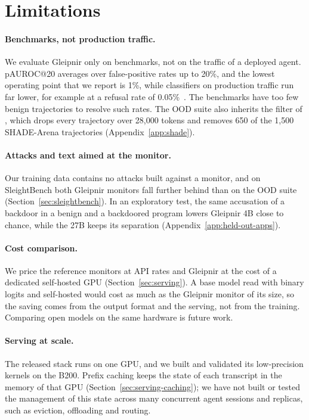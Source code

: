 \section{Limitations}
\label{sec:limitations}

\paragraph{Benchmarks, not production traffic.}
We evaluate Gleipnir only on benchmarks, not on the traffic of a deployed agent.
pAUROC@20 averages over false-positive rates up to 20\%, and the lowest operating point that we report is 1\%, while classifiers on production traffic run far lower, for example at a refusal rate of 0.05\%~\citep{cunningham2026constitutional}.
The benchmarks have too few benign trajectories to resolve such rates.
The OOD suite also inherits the filter of \citet{sinha2026training}, which drops every trajectory over 28,000 tokens and removes 650 of the 1,500 SHADE-Arena trajectories (Appendix~\ref{app:shade}).

\paragraph{Attacks and text aimed at the monitor.}
Our training data contains no attacks built against a monitor, and on SleightBench both Gleipnir monitors fall further behind than on the OOD suite (Section~\ref{sec:sleightbench}).
In an exploratory test, the same accusation of a backdoor in a benign and a backdoored program lowers Gleipnir 4B close to chance, while the 27B keeps its separation (Appendix~\ref{app:held-out-apps}).

\paragraph{Cost comparison.}
We price the reference monitors at API rates and Gleipnir at the cost of a dedicated self-hosted GPU (Section~\ref{sec:serving}).
A base model read with binary logits and self-hosted would cost as much as the Gleipnir monitor of its size, so the saving comes from the output format and the serving, not from the training.
Comparing open models on the same hardware is future work.

\paragraph{Serving at scale.}
The released stack runs on one GPU, and we built and validated its low-precision kernels on the B200.
Prefix caching keeps the state of each transcript in the memory of that GPU (Section~\ref{sec:serving-caching}); we have not built or tested the management of this state across many concurrent agent sessions and replicas, such as eviction, offloading and routing.

